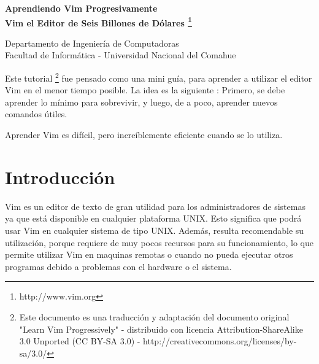 ﻿
\usepackage{fancyhdr}
	\pagestyle{fancy}
\usepackage{lastpage}	
	\lhead{}
	\chead{}
	\rhead{}
	\cfoot{}
	\rfoot{\footnotesize \thepage\ }	%
	\renewcommand{\headrulewidth}{0.0pt}
	\renewcommand{\footrulewidth}{0.4pt}

\def\ti#1#2{\texttt{#1} & #2 \\ }





\setlength{\parindent}{0pt}


\makeatletter
{\color{bl} \centering \huge \sc \textbf{
Aprendiendo Vim Progresivamente \\ 
\large \vspace*{-8pt} \color{black} Vim el Editor de Seis Billones de Dólares
\footnote{http://www.vim.org}
\vspace*{8pt} }\par}
\makeatother


\makeatletter
{\centering \small 
	Departamento de Ingeniería de Computadoras \\
	Facultad de Informática - Universidad Nacional del Comahue \\
	\vspace{20pt} }
\makeatother





Este tutorial
\footnote{Este documento es una traducción y adaptación del documento
original "Learn Vim Progressively" - distribuido con licencia
Attribution-ShareAlike 3.0 Unported (CC BY-SA 3.0) - 
http://creativecommons.org/licenses/by-sa/3.0/}
fue pensado como una mini guía, para aprender a utilizar el editor Vim 
en el menor tiempo posible. La idea
es la siguiente : Primero, se debe aprender lo mínimo para sobrevivir,
y luego, de a poco, aprender nuevos comandos útiles.

Aprender Vim es difícil, pero increíblemente eficiente cuando se lo utiliza.

\section{Introducción}

Vim es un editor de texto de gran utilidad para los administradores de sistemas ya
que está disponible en cualquier plataforma UNIX. Esto significa
que podrá usar Vim en cualquier sistema de tipo UNIX. Además,
resulta recomendable su utilización, porque requiere de muy pocos
recursos para su funcionamiento, lo que permite utilizar Vim
en maquinas remotas o cuando no pueda ejecutar otros programas
debido a problemas con el hardware o el sistema.

